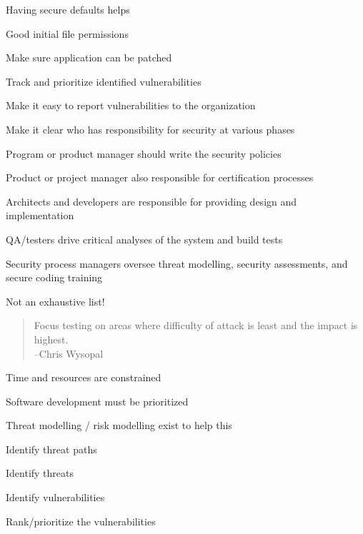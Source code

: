 \documentclass[Screen16to9,17pt]{foils}
\begin{document}

\begin{list2}
\item Having secure defaults helps
\item Good initial file permissions
\item Make sure application can be patched
\item Track and prioritize identified vulnerabilities
\item Make it easy to report vulnerabilities to the organization
\end{list2}


\begin{list2}
\item Make it clear who has responsibility for security at various phases
\item Program or product manager should write the security policies
\item Product or project manager also responsible for certification processes
\item Architects and developers are responsible for providing design and implementation
\item QA/testers drive critical analyses of the system and build tests
\item Security process managers oversee threat modelling, security assessments, and secure coding training
\vskip 1cm
\item Not an exhaustive list!
\end{list2}



\begin{quote}
Focus testing on areas where difficulty of attack is least and the impact is highest.\\
  --Chris Wysopal
\end{quote}

\begin{list1}
\item Time and resources are constrained
\item Software development must be prioritized
\item Threat modelling / risk modelling exist to help this
\begin{list2}
\item Identify threat paths
\item Identify threats
\item Identify vulnerabilities
\item Rank/prioritize the vulnerabilities
\end{list2}
\end{list1}
\end{document}
